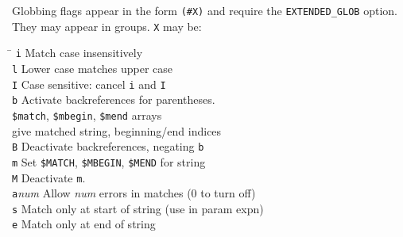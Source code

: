\documentclass{article}
\newcommand\I[1]{\textsl{#1}}
\newcommand\T[1]{\texttt{#1}}
\begin{document}
\begin{multicols}{3}
Globbing flags appear in the form \verb!(#X)! and require the
\T{EXTENDED\_GLOB} option.  They may appear in groups.  \verb!X! may be:
\begin{tabbing}
\hskip 40pt \= \kill
\verb!i!       \> Match case insensitively \\
\verb!l!       \> Lower case matches upper case \\
\verb!I!       \> Case sensitive: cancel \verb!i! and \verb!I! \\
\verb!b!       \> Activate backreferences for parentheses. \\
               \> \verb!$match!, \verb!$mbegin!, \verb!$mend! arrays \\
	       \> give matched string, beginning/end indices \\
\verb!B!       \> Deactivate backreferences, negating \verb!b! \\
\verb!m!       \> Set \verb!$MATCH!, \verb!$MBEGIN!, \verb!$MEND! for
                  string \\
\verb!M!       \> Deactivate \verb!m!. \\
\T{a}\I{num}   \> Allow \I{num} errors in matches (0 to turn off) \\
\verb!s!       \> Match only at start of string (use in param expn) \\
\verb!e!       \> Match only at end of string \\
\end{tabbing}


\end{multicols}
\end{document}

